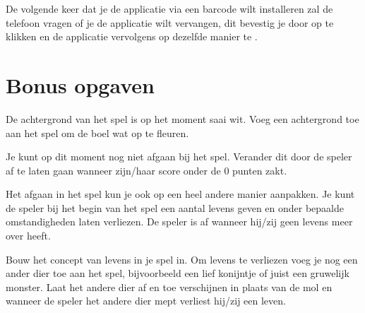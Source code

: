 De volgende keer dat je de applicatie via een barcode wilt installeren zal de telefoon vragen of je de applicatie wilt vervangen, dit bevestig je door op  te klikken en de applicatie vervolgens op dezelfde manier te .


\section{Bonus opgaven}
\begin{opgave}
    \opgVraag
  De achtergrond van het spel is op het moment saai wit.
  Voeg een achtergrond toe aan het spel om de boel wat op te fleuren.
\end{opgave}

\begin{opgave}
    \opgVraag
  Je kunt op dit moment nog niet afgaan bij het spel.
  Verander dit door de speler af te laten gaan wanneer zijn/haar score onder de 0 punten zakt.
\end{opgave}

Het afgaan in het spel kun je ook op een heel andere manier aanpakken. Je kunt de speler bij het begin van het spel een aantal levens geven en onder bepaalde omstandigheden laten verliezen. De speler is af wanneer hij/zij geen levens meer over heeft.

\begin{opgave}
    \opgVraag
  Bouw het concept van levens in je spel in. Om levens te verliezen voeg je nog een ander dier toe aan het spel, bijvoorbeeld een lief konijntje of juist een gruwelijk monster. Laat het andere dier af en toe verschijnen in plaats van de mol en wanneer de speler het andere dier mept verliest hij/zij een leven.
\end{opgave}
